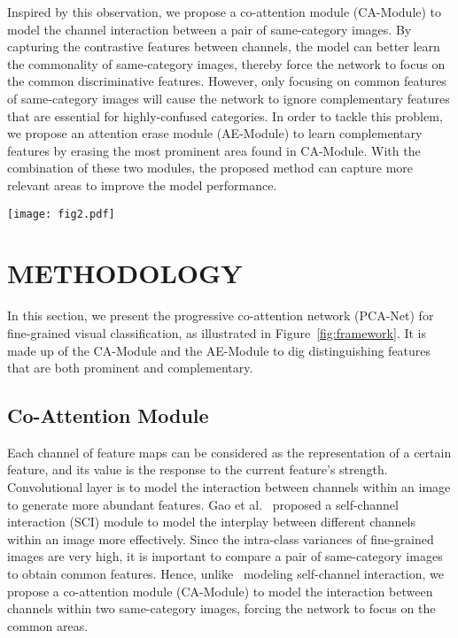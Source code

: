 \documentclass[conference]{IEEEtran}
\begin{document}
Inspired by this observation, we propose a co-attention module (CA-Module) to model the channel interaction between a pair of same-category images. By capturing the contrastive features between channels, the model can better learn the commonality of same-category images, thereby force the network to focus on the common discriminative features. However, only focusing on common features of same-category images will cause the network to ignore complementary features that are essential for highly-confused categories. In order to tackle this problem, we propose an attention erase module (AE-Module) to learn complementary features by erasing the most prominent area found in CA-Module. With the combination of these two modules, the proposed method can capture more relevant areas to improve the model performance. 

\begin{figure*}[ht]
\centering
\texttt{[image: fig2.pdf]}
\caption{The framework of the progressive co-attention network (PCA-Net). The CA-Module can model the channel-wise interaction within a pair of same-category images to focus on the prominent areas with common characteristics. The AE-Module can erase the images to distract attention to other areas to capture complementary features.}
\label{fig:framework}
\end{figure*}

\section{METHODOLOGY}
In this section, we present the progressive co-attention network (PCA-Net) for fine-grained visual classification, as illustrated in Figure~\ref{fig:framework}. It is made up of the CA-Module and the AE-Module to dig distinguishing features that are both prominent and complementary.


\subsection{Co-Attention Module}\label{AA}
Each channel of feature maps can be considered as the representation of a certain feature, and its value is the response to the current feature's strength. Convolutional layer is to model the interaction between channels within an image to generate more abundant features. Gao et al.~\cite{2020CIN} proposed a self-channel interaction (SCI) module to model the interplay between different channels within an image more effectively. Since the intra-class variances of fine-grained images are very high, it is important to compare a pair of same-category images to obtain common features. Hence, unlike~\cite{2020CIN} modeling self-channel interaction, we propose a co-attention module (CA-Module) to model the interaction between channels within two same-category images, forcing the network to focus on the common areas.
\end{document}
